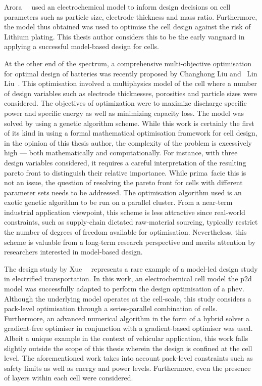 Arora~\etal~\cite{Arora1999}  used an  electrochemical  model  to inform  design
decisions on cell parameters such as particle size, electrode thickness and mass
ratio. Furthermore, the model thus obtained was used to optimise the cell design
against the risk of Lithium plating. This thesis author considers this to be the
early vanguard in applying a successful model-based design for cells.

At the other  end of the spectrum, a  comprehensive multi-objective optimisation
for optimal design of batteries was  recently proposed by Changhong Liu and~ Lin
Liu~\cite{Liu2017b}. This optimisation involved a multiphysics model of the cell
where a number of design variables such as electrode thicknesses, porosities and
particle sizes were considered. The  objectives of optimization were to maximize
discharge  specific power  and specific  energy as  well as  minimizing capacity
loss. The model was solved by using  a genetic algorithm scheme. While this work
is certainly the  first of its kind in using  a formal mathematical optimisation
framework for cell design, in the  opinion of this thesis author, the complexity
of the problem is excessively  high --- both mathematically and computationally.
For  instance, with  three design  variables considered,  it requires  a careful
interpretation  of the  resulting  pareto front  to  distinguish their  relative
importance. While  prima~facie this is not  an issue, the question  of resolving
the pareto front for cells with  different parameter sets needs to be addressed.
The optimisation algorithm  used is an exotic  genetic algorithm to be  run on a
parallel cluster. From a near-term industrial application viewpoint, this scheme
is less attractive  since real-world constraints, such  as supply-chain dictated
raw-material  sourcing, typically  restrict  the number  of  degrees of  freedom
available  for  optimisation.  Nevertheless,  this scheme  is  valuable  from  a
long-term research perspective and merits attention by researchers interested in
model-based design.

The  design study  by  Xue~\etal~\cite{Xue2013a} represents  a  rare example  of
a  model-led  design study  in  electrified  transportation.  In this  work,  an
electrochemical cell model  \viz{} the \gls{p2d} model  was successfully adapted
to  perform the  design optimisation  of a  \gls{phev}. Although  the underlying
model operates at the cell-scale, this study considers a pack-level optimisation
through  a  series-parallel  combination  of  cells.  Furthermore,  an  advanced
numerical  algorithm in  the  form  of a  hybrid  solver  \ie{} a  gradient-free
optimiser  in conjunction  with a  gradient-based optimiser  was used.  Albeit a
unique example in the context of vehicular application, this work falls slightly
outside the  scope of  this thesis wherein  the design is  confined at  the cell
level. The aforementioned work takes into account pack-level constraints such as
safety limits as well as energy and power levels. Furthermore, even the presence
of layers within each cell  were considered.


